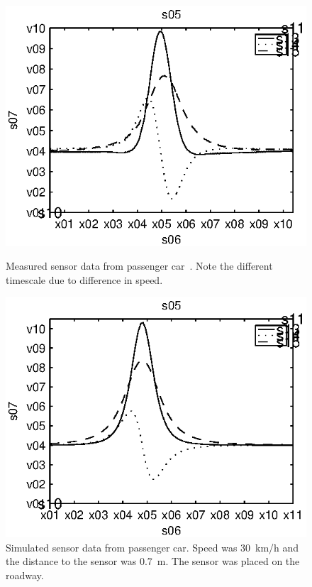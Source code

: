 \begin{subfigures}
\begin{figure}[tfhb]
 \centering
 \begin{minipage}{0.45\linewidth}
 	\centering
 	
	\includegraphics[width=1\linewidth]{images/realdata}
  	\caption[Measured sensor data from passenger car]{Measured sensor data from passenger car~\cite{imego2007}. Note the different timescale due to difference in speed.\\}
  	\label{fig:realdata} 
 \end{minipage} \hfill
 \begin{minipage}{0.45\linewidth}
 	\centering
 	
  	\includegraphics[width=1\linewidth]{images/simdata}
  	\caption[Simulated sensor data from passenger car]{Simulated sensor data from passenger car. Speed was 30~km/h and the distance to the sensor was 0.7~m. The sensor was placed on the roadway.}
  	\label{fig:simdata}
 \end{minipage}
\end{figure}
\end{subfigures}
